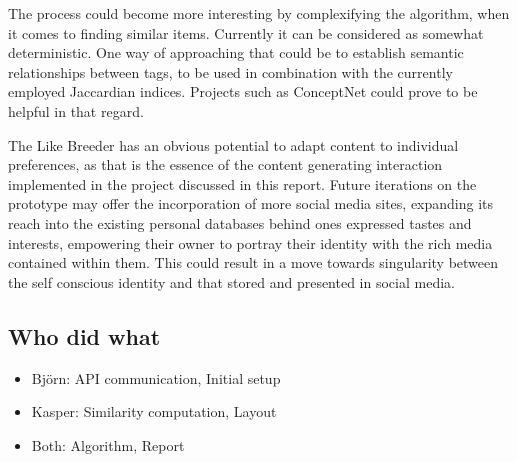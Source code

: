 \documentclass[conference]{IEEETran}
\begin{document}
The process could become more interesting by complexifying the algorithm, when it comes to finding similar items.  Currently it can be considered as somewhat deterministic.  One way of approaching that could be to establish semantic relationships between tags, to be used in combination with the currently employed Jaccardian indices.  Projects such as ConceptNet \cite{speer2013conceptnet} could prove to be helpful in that regard.




The Like Breeder has an obvious potential to adapt content to individual preferences, as that is the essence of the content generating interaction implemented in the project discussed in this report.  Future iterations on the prototype may offer the incorporation of more social media sites, expanding its reach into the existing personal databases behind ones expressed tastes and interests, empowering their owner to portray their identity with the rich media contained within them.  This could result in a move towards singularity between the self conscious identity and that stored and presented in social media.



\subsection{Who did what}
\begin{itemize}
\item Björn: API communication, Initial setup
\item Kasper: Similarity computation, Layout 
\item Both: Algorithm, Report
\end{itemize}



\end{document}
